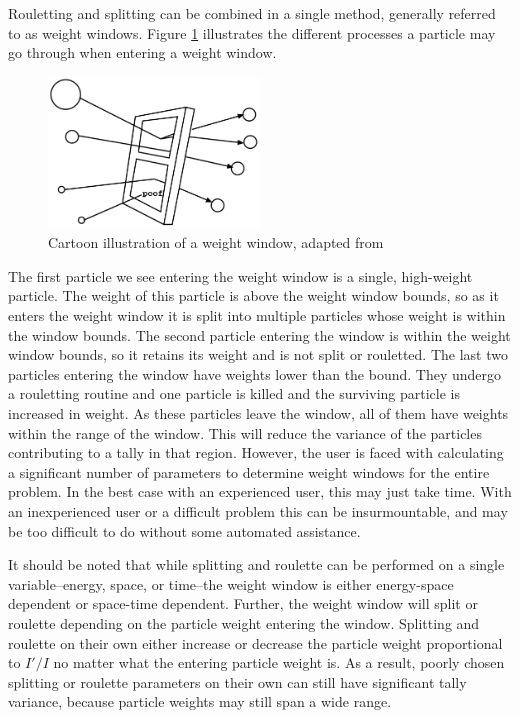 Rouletting and splitting can be combined in a
single method, generally referred to as weight windows. Figure \ref{fig:ww-mcnp}
illustrates the different processes a particle may go through when entering a
weight window.
%
\begin{figure}
  \centering
  \includegraphics[width=0.5\textwidth]{./chapters/lit_review/ww-mcnp.png}
  \caption[Weight window illustration]{Cartoon illustration of a weight window,
    adapted from \cite{brown_mcnp_2002}}
  \label{fig:ww-mcnp}
\end{figure}
%
The first particle we see entering the weight window is a single, high-weight
particle. The weight of this particle is above the weight window bounds, so as
it enters the weight window it is split into multiple particles whose weight is
within the window bounds. The second particle entering the window is within the
weight window bounds, so it retains its weight and is not split or rouletted.
The last two particles entering the window have weights lower than the bound.
They undergo a rouletting routine and one particle is killed and the surviving
particle is increased in weight. As these particles leave the window, all of
them have weights within the range of the window. This will reduce the variance
of the particles contributing to a tally in that region. However, the user is
faced with calculating a significant number of parameters to
determine weight windows for the entire problem. In the best case with an
experienced user, this may just take time. With an inexperienced user or a
difficult problem this can
be insurmountable, and may be too difficult to do without some automated
assistance.

It should be noted that
while splitting and roulette can be performed on a single variable--energy,
space, or time--the weight window is either energy-space
dependent or space-time dependent. Further, the weight window will split or
roulette depending on the particle weight entering the window. Splitting and
roulette on their own either increase or decrease the particle weight
proportional to $I'/I$ no matter what the entering particle weight is. As a
result, poorly chosen splitting or roulette parameters on their own can still
have significant tally variance, because particle weights may still span a wide
range.

